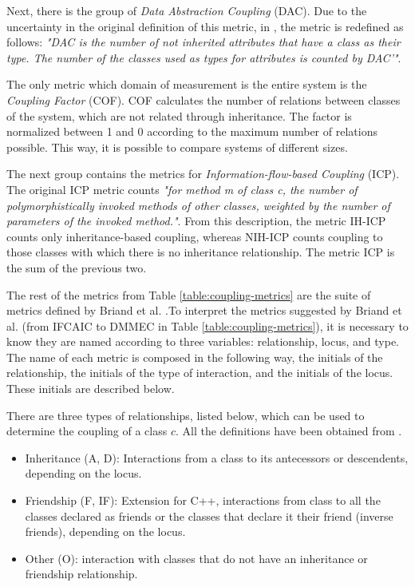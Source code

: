Next, there is the group of \textit{Data Abstraction Coupling} (DAC). Due to the uncertainty in the original definition of this metric, in \cite{briand1999unified}, the metric is redefined as follows: \textit{"DAC is the number of not inherited attributes that have a class as their type. The number of the classes used as types for attributes is counted by DAC'"}.

The only metric which domain of measurement is the entire system is the \textit{Coupling Factor} (COF). COF calculates the number of relations between classes of the system, which are not related through inheritance. The factor is normalized between 1 and 0 according to the maximum number of relations possible. This way, it is possible to compare systems of different sizes.

The next group contains the metrics for \textit{Information-flow-based Coupling} (ICP). The original ICP metric counts \textit{"for method m of class c, the number of polymorphistically invoked methods of other classes, weighted by the number of parameters of the invoked method."}. From this description, the metric IH-ICP counts only inheritance-based coupling, whereas NIH-ICP counts coupling to those classes with which there is no inheritance relationship. The metric ICP is the sum of the previous two.

The rest of the metrics from Table \ref{table:coupling-metrics} are the suite of metrics defined by Briand et al. \cite{briand1997investigation}.To interpret the metrics suggested by Briand et al. \cite{briand1997investigation}  (from IFCAIC to DMMEC in Table \ref{table:coupling-metrics}), it is necessary to know they are named according to three variables: relationship, locus, and type. The name of each metric is composed in the following way, the initials of the relationship, the initials of the type of interaction, and the initials of the locus. These initials are described below.

\bigskip\noindent
There are three types of relationships, listed below, which can be used to determine the coupling of a class $c$. All the definitions have been obtained from \cite{briand1997investigation}.

\begin{itemize}
  \item Inheritance (A, D): Interactions from a class to its antecessors or descendents, depending on the locus.
  \item Friendship (F, IF): Extension for C++, interactions from class to all the  classes declared as friends or the classes that declare it their friend (inverse friends), depending on the locus.
  \item Other (O): interaction with classes that do not have an inheritance or friendship relationship.
\end{itemize}

